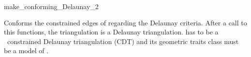\begin{ccRefFunction}{make_conforming_Delaunay_2}


{ Conforms the constrained edges of  regarding the Delaunay
  criteria. After a call to this functions, the triangulation is a
  Delaunay triangulation.
  \ccPrecond {} has to be a \cgal\ constrained Delaunay
  triangulation (CDT) and its geometric traits class must be a model
  of .}

\end{ccRefFunction}

